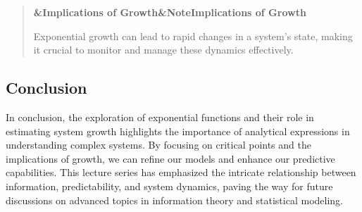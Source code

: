 \documentclass[a4paper]{article}
\newcommand{\boxheading}[1]{%
  \par\smallskip
  \noindent\textbf{\ifx&#1&Note\else#1\fi}\par
  \smallskip
}
\newenvironment{rembox}[1][]{%
  \begin{quote}\color{black!70}\boxheading{#1}\normalcolor
}{\end{quote}}
\begin{document}
\begin{rembox}[Implications of Growth]
Exponential growth can lead to rapid changes in a system's state, making it crucial to monitor and manage these dynamics effectively.
\end{rembox}

\subsection{Conclusion}
In conclusion, the exploration of exponential functions and their role in estimating system growth highlights the importance of analytical expressions in understanding complex systems. By focusing on critical points and the implications of growth, we can refine our models and enhance our predictive capabilities. This lecture series has emphasized the intricate relationship between information, predictability, and system dynamics, paving the way for future discussions on advanced topics in information theory and statistical modeling.
\end{document}
